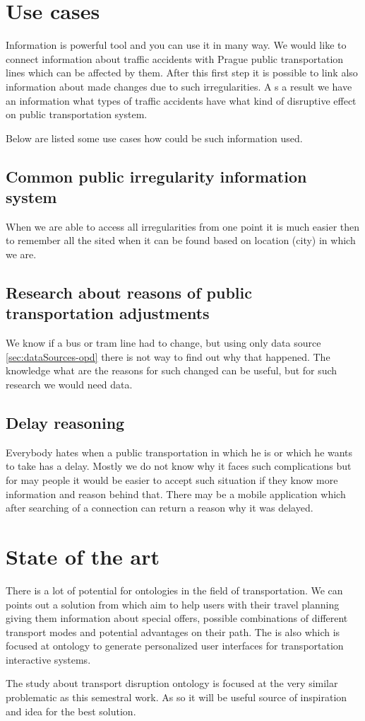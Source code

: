 \documentclass{article}
\begin{document}
\section{\label{sec:useCases}Use cases}

Information is powerful tool and you can use it in many way. We would like to connect information about traffic accidents with Prague public transportation lines which can be affected by them. After this first step it is possible to link also information about made changes due to such irregularities. A s a result we have an information what types of traffic accidents have what kind of disruptive effect on public transportation system.

Below are listed some use cases how could be such information used.

\subsection{Common public irregularity information system}
When we are able to access all irregularities from one point it is much easier then to remember all the sited when it can be found based on location (city) in which we are.

\subsection{Research about reasons of public transportation adjustments}
We know if a bus or tram line had to change, but using only data source \ref{sec:dataSources-opd} there is not way to find out why that happened. The knowledge what are the reasons for such changed can be useful, but for such research we would need data.

\subsection{Delay reasoning}
Everybody hates when a public transportation in which he is or which he wants to take has a delay. Mostly we do not know why it faces such complications but for may people it would be easier to accept such situation if they know more information and reason behind that. There may be a mobile application which after searching of a connection can return a reason why it was delayed. 



\section{\label{sec:stateArt}State of the art}
There is a lot of potential for ontologies in the field of transportation. We can points out a solution from \cite{houda2010public} which aim to help users with their travel planning giving them information about special offers, possible combinations of different transport modes and potential advantages on their path. The is also \cite{de2013transportation} which is focused at ontology to generate personalized user interfaces for transportation interactive systems. 

The study about transport disruption ontology \cite{corsar2015transport} is focused at the very similar problematic as this semestral work. As so it will be useful source of inspiration and idea for the best solution.

\appendix


\printbibliography
\end{document}

